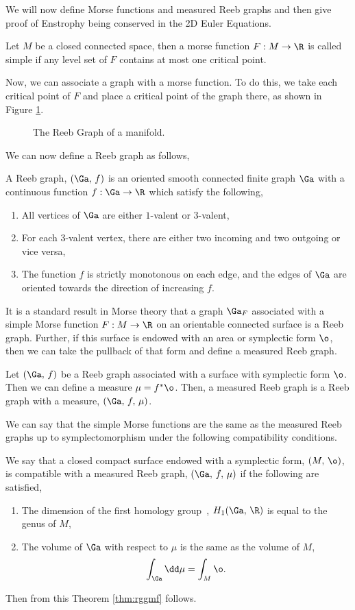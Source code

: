 \noindent
We will now define Morse functions and measured Reeb graphs and then give proof of Enstrophy being conserved in the 2D Euler Equations.
\begin{ndefi}
  Let $M$ be a closed connected space, then a morse function $F : M \to \R$ is called simple if any level set of $F$ contains at most one critical point.
\end{ndefi}
\noindent
Now, we can associate a graph with a morse function. To do this, we take each critical point of $F$ and place a critical point of the graph there, as shown in Figure \ref{fig:reeb}.
\begin{figure}[!ht]
\centering
\resizebox{0.6\textwidth}{!}{}
\caption{The Reeb Graph of a manifold.}
\label{fig:reeb}
\end{figure}
\noindent
We can now define a Reeb graph as follows,
\begin{ndefi}
  A Reeb  graph, $(\Ga,\, f)$ is an oriented smooth connected finite graph $\Ga$ with a continuous function $f : \Ga \to \R$ which satisfy the following,
  \begin{enumerate}
    \item All vertices of $\Ga$ are either $1$-valent or $3$-valent,
    \item For each $3$-valent vertex, there are either two incoming and two outgoing or vice versa,
    \item The function $f$ is strictly monotonous on each edge, and the edges of $\Ga$ are oriented towards the direction of increasing $f$.
  \end{enumerate}
\end{ndefi}
\noindent
It is a standard result in Morse theory that a graph $\Ga_F$ associated with a simple Morse function $F : M \to \R$ on an orientable connected surface is a Reeb graph. Further, if this surface is endowed with an area or symplectic form $\o$, then we can take the pullback of that form and define a measured Reeb graph.
\begin{ndefi}
  Let $(\Ga,\, f)$ be a Reeb graph associated with a surface with symplectic form $\o$. Then we can define a measure $\mu = f^*\o$. Then, a measured Reeb graph is a Reeb graph with a measure, $(\Ga,\, f,\, \mu)$.
\end{ndefi}
\noindent
We can say that the simple Morse functions are the same as the measured Reeb graphs up to symplectomorphism under the following compatibility conditions.
\begin{ndefi}[Compatible]
  We say that a closed compact surface endowed with a symplectic form, $(M,\, \o)$, is compatible with a measured Reeb graph, $(\Ga,\, f,\, \mu)$ if the following are satisfied,
	\begin{enumerate}
		\item The dimension of the first homology group~\cite{hatcher}, $H_1(\Ga,\, \R)$ is equal to the genus of $M$,
		\item The volume of $\Ga$ with respect to $\mu$ is the same as the volume of $M$,
		$$ \int_\Ga \dd \mu = \int_M \o. $$
	\end{enumerate}
\end{ndefi}
\noindent
Then from this Theorem \ref{thm:rggmf} follows.

